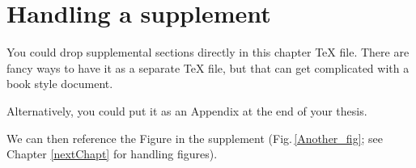 \section{Handling a supplement}

You could drop supplemental sections directly in this chapter \TeX{} file. There are fancy ways to have it as a separate \TeX{} file, but that can get complicated with a book style document. 

Alternatively, you could put it as an Appendix at the end of your thesis. 

We can then reference the Figure in the supplement (Fig.\,\ref{Another_fig}; see Chapter \ref{nextChapt} for handling figures). 











